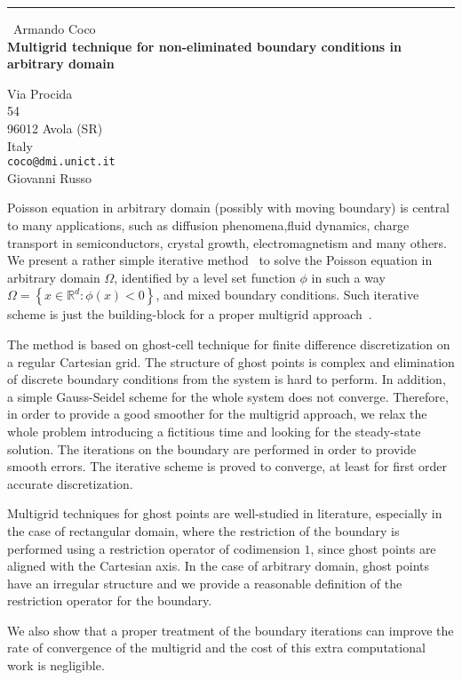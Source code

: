 \documentclass{report}
\begin{document}
\begin{center}
\rule{6in}{1pt} \
{\large Armando Coco \\
{\bf Multigrid technique for non-eliminated boundary conditions in arbitrary domain}}

Via Procida \\ 54 \\ 96012 Avola (SR) \\ Italy
\\
{\tt coco@dmi.unict.it}\\
Giovanni Russo\end{center}

Poisson equation in arbitrary domain (possibly with moving boundary) is
central to many applications, such as diffusion phenomena,fluid dynamics,
charge transport in semiconductors, crystal growth, electromagnetism and
many others.
We present a rather simple iterative method~\cite{CocoRusso:Elliptic} to
solve the Poisson equation in arbitrary domain $\Omega$, identified by a
level set function $\phi$ in such a way $\Omega=\left\{ x \in
\mathbb{R}^d \colon \phi(x)<0 \right\}$, and mixed boundary conditions.
Such iterative scheme is just the building-block for a proper multigrid
approach~\cite{CocoRusso:MG}.

The method is based on ghost-cell technique for finite difference
discretization on a regular Cartesian grid. The structure of ghost points
is complex and elimination of discrete boundary conditions from the
system is hard to perform. In addition, a simple Gauss-Seidel scheme for
the whole system does not converge. Therefore, in order to provide a good
smoother for the multigrid approach, we relax the whole problem
introducing a fictitious time and looking for the steady-state solution.
The iterations on the boundary are performed in order to provide smooth
errors. The iterative scheme is proved to converge, at least for first
order accurate discretization.

Multigrid techniques for ghost points are well-studied in literature,
especially in the case of rectangular domain, where the restriction of
the boundary is performed using a restriction operator of codimension
$1$, since ghost points are aligned with the Cartesian axis.
In the case of arbitrary domain, ghost points have an irregular structure
and we provide a reasonable definition of the restriction operator for
the boundary.

We also show that a proper treatment of the boundary iterations can
improve the rate of convergence of the multigrid and the cost of this
extra computational work is negligible.
\end{document}
